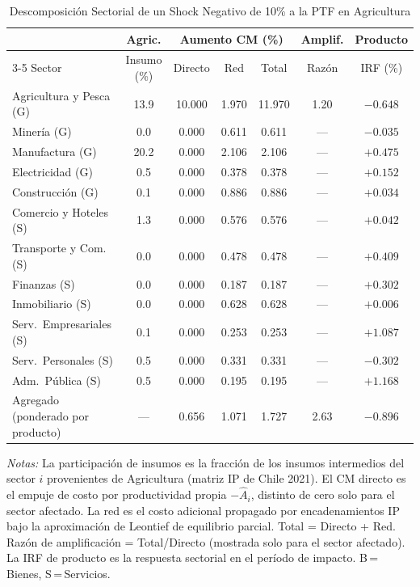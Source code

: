 \begin{table}[htbp]
\centering
\caption{Descomposición Sectorial de un Shock Negativo de 10\% a la PTF en Agricultura}
\label{tab:agr_decomp}
\begin{threeparttable}
\small
\begin{tabular}{@{}l c c c c c c@{}}
\toprule
 & Agric. & \multicolumn{3}{c}{Aumento CM (\%)} & Amplif. & Producto \\
\cmidrule(lr){3-5}
Sector & Insumo (\%) & Directo & Red & Total & Razón & IRF (\%) \\
\midrule
Agricultura y Pesca (G) & 13.9 & 10.000 & 1.970 & 11.970 &  1.20 & $-0.648$ \\
Minería (G) &  0.0 & 0.000 & 0.611 & 0.611 & --- & $-0.035$ \\
Manufactura (G) & 20.2 & 0.000 & 2.106 & 2.106 & --- & $+0.475$ \\
Electricidad (G) &  0.5 & 0.000 & 0.378 & 0.378 & --- & $+0.152$ \\
Construcción (G) &  0.1 & 0.000 & 0.886 & 0.886 & --- & $+0.034$ \\
Comercio y Hoteles (S) &  1.3 & 0.000 & 0.576 & 0.576 & --- & $+0.042$ \\
Transporte y Com. (S) &  0.0 & 0.000 & 0.478 & 0.478 & --- & $+0.409$ \\
Finanzas (S) &  0.0 & 0.000 & 0.187 & 0.187 & --- & $+0.302$ \\
Inmobiliario (S) &  0.0 & 0.000 & 0.628 & 0.628 & --- & $+0.006$ \\
Serv.\ Empresariales (S) &  0.1 & 0.000 & 0.253 & 0.253 & --- & $+1.087$ \\
Serv.\ Personales (S) &  0.5 & 0.000 & 0.331 & 0.331 & --- & $-0.302$ \\
Adm.\ Pública (S) &  0.5 & 0.000 & 0.195 & 0.195 & --- & $+1.168$ \\
\midrule
Agregado (ponderado por producto) & --- & 0.656 & 1.071 & 1.727 &  2.63 & $-0.896$ \\
\bottomrule
\end{tabular}
\begin{tablenotes}[flushleft]
\footnotesize
\item \textit{Notas:} La participación de insumos es la fracción de los insumos intermedios del sector $i$ provenientes de Agricultura (matriz IP de Chile 2021). El CM directo es el empuje de costo por productividad propia $-\hat A_i$, distinto de cero solo para el sector afectado. La red es el costo adicional propagado por encadenamientos IP bajo la aproximación de Leontief de equilibrio parcial. Total = Directo + Red. Razón de amplificación = Total/Directo (mostrada solo para el sector afectado). La IRF de producto es la respuesta sectorial en el período de impacto. B\,=\,Bienes, S\,=\,Servicios.
\end{tablenotes}
\end{threeparttable}
\end{table}
